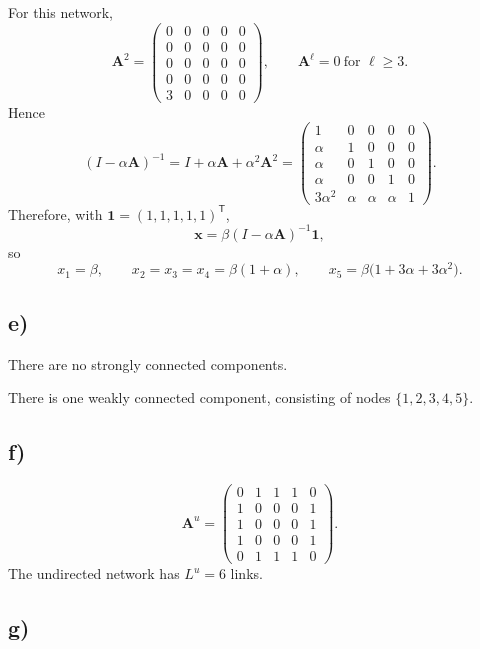 \documentclass[11pt,a4paper]{article}
\begin{document}
\medskip
\noindent
For this network,
\[
  \mathbf{A}^2 =
  \begin{pmatrix}
    0 & 0 & 0 & 0 & 0 \\
    0 & 0 & 0 & 0 & 0 \\
    0 & 0 & 0 & 0 & 0 \\
    0 & 0 & 0 & 0 & 0 \\
    3 & 0 & 0 & 0 & 0
  \end{pmatrix},
  \qquad
  \mathbf{A}^{\ell} = 0 \ \text{for } \ell \ge 3.
\]
Hence
\[
  (I - \alpha \mathbf{A})^{-1} = I + \alpha \mathbf{A} + \alpha^2 \mathbf{A}^2
  =
  \begin{pmatrix}
    1 & 0 & 0 & 0 & 0 \\
    \alpha & 1 & 0 & 0 & 0 \\
    \alpha & 0 & 1 & 0 & 0 \\
    \alpha & 0 & 0 & 1 & 0 \\
    3\alpha^2 & \alpha & \alpha & \alpha & 1
  \end{pmatrix}.
\]
Therefore, with $\mathbf{1} = (1,1,1,1,1)^{\mathsf{T}}$,
\[
  \mathbf{x} = \beta (I - \alpha \mathbf{A})^{-1} \mathbf{1},
\]
so
\[
  x_1 = \beta,\qquad
  x_2 = x_3 = x_4 = \beta(1 + \alpha),\qquad
  x_5 = \beta\bigl(1 + 3\alpha + 3\alpha^2\bigr).
\]

\subsection*{e)}

There are no strongly connected components.

There is one weakly connected component, consisting of nodes $\{1,2,3,4,5\}$.

\subsection*{f)}

\[
  \mathbf{A}^{u} =
  \begin{pmatrix}
    0 & 1 & 1 & 1 & 0 \\
    1 & 0 & 0 & 0 & 1 \\
    1 & 0 & 0 & 0 & 1 \\
    1 & 0 & 0 & 0 & 1 \\
    0 & 1 & 1 & 1 & 0
  \end{pmatrix}.
\]
The undirected network has $L^{u} = 6$ links.

\subsection*{g)}
\end{document}
